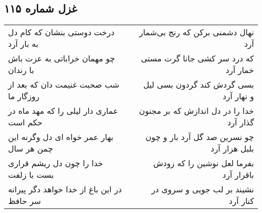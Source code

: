 \begin{center}
\section*{غزل شماره ۱۱۵}
\label{sec:sh115}
\begin{longtable}{l p{0.5cm} r}
درخت دوستی بنشان که کام دل به بار آرد
&&
نهال دشمنی برکن که رنج بی‌شمار آرد
\\
چو مهمان خراباتی به عزت باش با رندان
&&
که درد سر کشی جانا گرت مستی خمار آرد
\\
شب صحبت غنیمت دان که بعد از روزگار ما
&&
بسی گردش کند گردون بسی لیل و نهار آرد
\\
عماری دار لیلی را که مهد ماه در حکم است
&&
خدا را در دل اندازش که بر مجنون گذار آرد
\\
بهار عمر خواه ای دل وگرنه این چمن هر سال
&&
چو نسرین صد گل آرد بار و چون بلبل هزار آرد
\\
خدا را چون دل ریشم قراری بست با زلفت
&&
بفرما لعل نوشین را که زودش باقرار آرد
\\
در این باغ از خدا خواهد دگر پیرانه سر حافظ
&&
نشیند بر لب جویی و سروی در کنار آرد
\\
\end{longtable}
\end{center}
